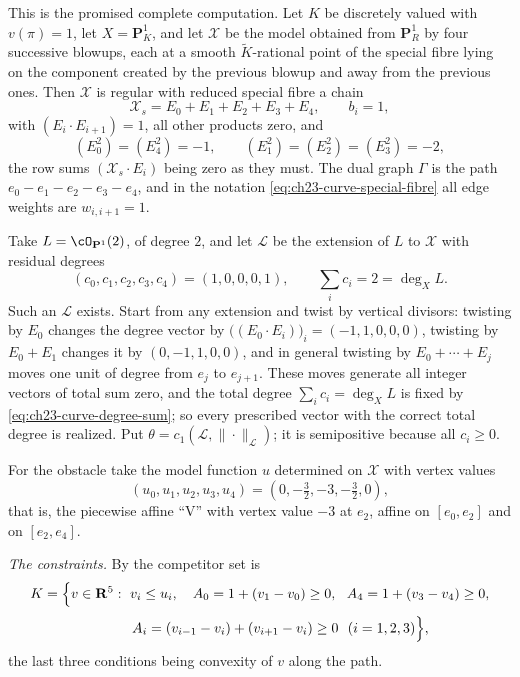 \begin{example}
\label{ex:ch23-curve-envelope-numbers}
This is the promised complete computation.  Let \(K\) be discretely valued
with \(v(\pi)=1\), let \(X=\mathbf P^1_K\), and let \(\mathcal X\) be the
model obtained from \(\mathbf P^1_R\) by four successive blowups, each at a
smooth \(\widetilde K\)-rational point of the special fibre lying on the component created by the
previous blowup and away from the previous ones.  Then \(\mathcal X\) is
regular with reduced special fibre a chain
\[
 \mathcal X_s=E_0+E_1+E_2+E_3+E_4,
 \qquad b_i=1,
\]
with \((E_i\cdot E_{i+1})=1\), all other products zero, and
\[
 (E_0^2)=(E_4^2)=-1,\qquad (E_1^2)=(E_2^2)=(E_3^2)=-2 ,
\]
the row sums \((\mathcal X_s\cdot E_i)\) being zero as they must.  The dual
graph \(\Gamma\) is the path \(e_0-e_1-e_2-e_3-e_4\), and in the notation
\eqref{eq:ch23-curve-special-fibre} all edge weights are
\(w_{i,i+1}=1\).

Take \(L=\cO_{\mathbf P^1}(2)\), of degree \(2\), and let \(\mathcal L\) be
the extension of \(L\) to \(\mathcal X\) with residual degrees
\[
 (c_0,c_1,c_2,c_3,c_4)=(1,0,0,0,1),
 \qquad \sum_ic_i=2=\deg_XL .
\]
Such an \(\mathcal L\) exists.  Start from any extension and twist by
vertical divisors: twisting by \(E_0\) changes the degree vector by
\(\bigl((E_0\cdot E_i)\bigr)_i=(-1,1,0,0,0)\), twisting by \(E_0+E_1\)
changes it by \((0,-1,1,0,0)\), and in general twisting by
\(E_0+\cdots+E_j\) moves one unit of degree from \(e_j\) to \(e_{j+1}\).
These moves generate all integer vectors of total sum zero, and the total
degree \(\sum_ic_i=\deg_XL\) is fixed by
\eqref{eq:ch23-curve-degree-sum}; so every prescribed vector with the
correct total degree is realized.  Put
\(\theta=c_1(\mathcal L,\|\cdot\|_{\mathcal L})\); it is semipositive
because all \(c_i\geq0\).

For the obstacle take the model function \(u\) determined on \(\mathcal X\)
with vertex values
\[
 (u_0,u_1,u_2,u_3,u_4)=(0,-\tfrac32,-3,-\tfrac32,0),
\]
that is, the piecewise affine ``V'' with vertex value \(-3\) at \(e_2\),
affine on \([e_0,e_2]\) and on \([e_2,e_4]\).

\emph{The constraints.}  By
 the competitor set is
\[
 K=\Bigl\{v\in\mathbf R^5:\ v_i\leq u_i,\quad
   A_0=1+(v_1-v_0)\geq0,\ \
   A_4=1+(v_3-v_4)\geq0,
\]
\[
 \phantom{K=\Bigl\{}
   A_i=(v_{i-1}-v_i)+(v_{i+1}-v_i)\geq0\ \ (i=1,2,3)\Bigr\},
\]
the last three conditions being convexity of \(v\) along the path.


\end{example}
